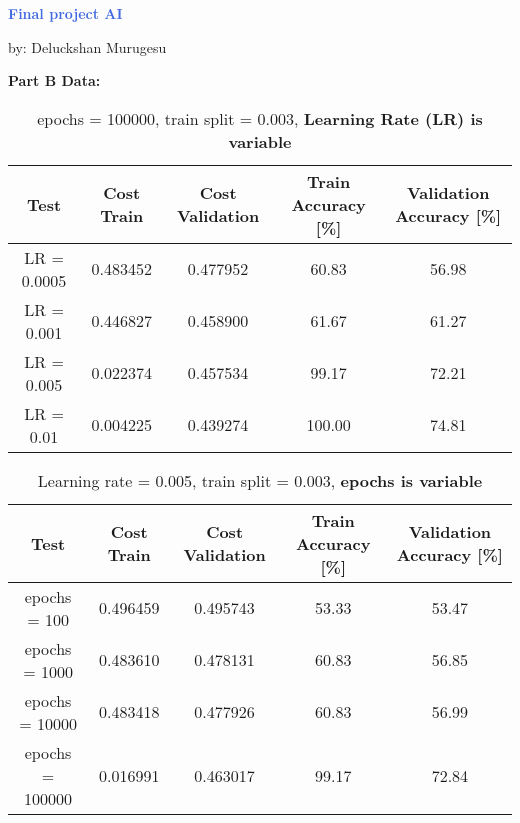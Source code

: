 \documentclass[12pt]{article}
\begin{document}
\begin{center}
    {\fontsize{20}{14}\selectfont\textcolor{RoyalBlue}{\textbf{Final project AI}}} 
    \vspace{\baselineskip}
    
    by: Deluckshan Murugesu
\end{center}
\vspace{\baselineskip}
\vspace{\baselineskip}
{\fontsize{15}{14}\selectfont\textcolor{BurntOrange}{\textbf{Part B Data:}}}

\vspace{\baselineskip}
\begin{table}[h!]
    \centering
    \caption{epochs = 100000, train split = 0.003, \textbf{Learning Rate (LR) is variable}}
    \label{table:1}
    \begin{tabular}{|c|c|c|c|c|}
         \hline
         Test & Cost Train & Cost Validation & Train Accuracy [\%] & Validation Accuracy [\%] \\ 
         \hline
         LR = 0.0005 & 0.483452 & 0.477952 & 60.83 & 56.98 \\
         \hline
         LR = 0.001 & 0.446827 & 0.458900 & 61.67 & 61.27 \\
         \hline
         LR = 0.005 & 0.022374 & 0.457534 & 99.17 & 72.21 \\
         \hline
         LR = 0.01 & 0.004225 & 0.439274 & 100.00 & 74.81 \\
         \hline
    \end{tabular}
\end{table}

\begin{table}[h!]
    \centering
    \caption{Learning rate = 0.005, train split = 0.003, \textbf{epochs is variable}}
    \label{table:2}
    \begin{tabular}{|c|c|c|c|c|}
         \hline
         Test & Cost Train & Cost Validation & Train Accuracy [\%] & Validation Accuracy [\%] \\ 
         \hline
         epochs = 100 & 0.496459 & 0.495743 & 53.33 & 53.47 \\
         \hline
         epochs = 1000 & 0.483610 & 0.478131 & 60.83 & 56.85 \\
         \hline
         epochs = 10000 & 0.483418 & 0.477926 & 60.83 & 56.99 \\
         \hline
         epochs = 100000 & 0.016991 & 0.463017 & 99.17 & 72.84 \\
         \hline
    \end{tabular}
\end{table}
\end{document}
